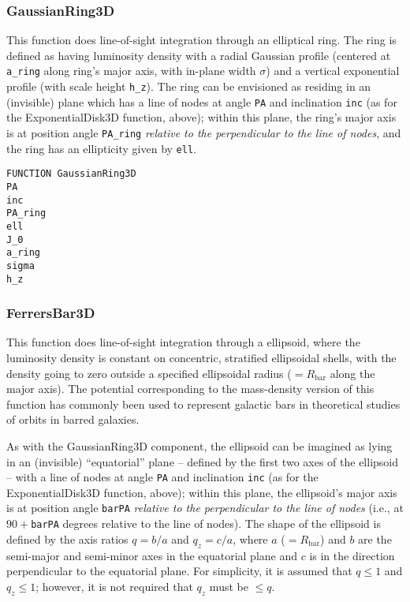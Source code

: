 \documentclass[10pt,a4paper,article]{memoir}
\begin{document}
\subsubsection{GaussianRing3D}

This function does line-of-sight integration through an elliptical ring.
The ring is defined as having luminosity density with a radial Gaussian
profile (centered at \texttt{a\_ring} along ring's major axis, with
in-plane width $\sigma$) and a vertical exponential profile (with scale
height \texttt{h\_z}). The ring can be envisioned as residing in an
(invisible) plane which has a line of nodes at angle \texttt{PA} and
inclination \texttt{inc} (as for the ExponentialDisk3D function, above);
within this plane, the ring's major axis is at position angle
\texttt{PA\_ring} \textit{relative to the perpendicular to the line of
nodes}, and the ring has an ellipticity given by \texttt{ell}.

\begin{verbatim}
FUNCTION GaussianRing3D
PA
inc
PA_ring
ell
J_0
a_ring
sigma
h_z
\end{verbatim}






\subsubsection{FerrersBar3D}

This function does line-of-sight integration through a \citet{ferrers}
ellipsoid, where the luminosity density is constant on concentric,
stratified ellipsoidal shells, with the density going to zero outside a
specified ellipsoidal radius ($= R_{\mathrm{bar}}$ along the major
axis). The potential corresponding to the mass-density version of this
function has commonly been used to represent galactic bars in
theoretical studies of orbits in barred galaxies.

As with the GaussianRing3D component, the ellipsoid can be imagined as
lying in an (invisible) ``equatorial'' plane -- defined by the first two
axes of the ellipsoid -- with a line of nodes at angle \texttt{PA} and
inclination \texttt{inc} (as for the ExponentialDisk3D function, above);
within this plane, the ellipsoid's major axis is at position angle
\texttt{barPA} \textit{relative to the perpendicular to the line of
nodes} (i.e., at $90 + $\texttt{barPA} degrees relative to the line of
nodes). The shape of the ellipsoid is defined by the axis ratios $q =
b/a$ and $q_{z} = c/a$, where $a$ ($= R_{\mathrm{bar}}$) and $b$ are the
semi-major and semi-minor axes in the equatorial plane and $c$ is in the
direction perpendicular to the equatorial plane. For simplicity, it is
assumed that $q \leq 1$ and $q_{z} \leq 1$; however, it is not required
that $q_{z}$ must be $\leq q$.
\end{document}
